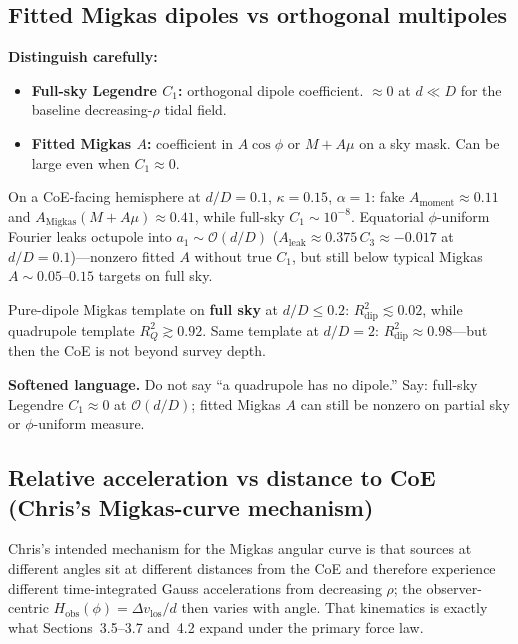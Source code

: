 \documentclass[11pt,a4paper]{article}
\begin{document}
\subsection{Fitted Migkas dipoles vs orthogonal multipoles}

\textbf{Distinguish carefully:}
\begin{itemize}
\item \textbf{Full-sky Legendre \(C_1\):} orthogonal dipole coefficient. \(\approx 0\) at \(d\ll D\) for the baseline decreasing-\(\rho\) tidal field.
\item \textbf{Fitted Migkas \(A\):} coefficient in \(A\cos\phi\) or \(M+A\mu\) on a sky mask. Can be large even when \(C_1\approx 0\).
\end{itemize}

On a CoE-facing hemisphere at \(d/D=0.1\), \(\kappa=0.15\), \(\alpha=1\): fake \(A_{\mathrm{moment}}\approx 0.11\) and \(A_{\mathrm{Migkas}}(M+A\mu)\approx 0.41\), while full-sky \(C_1\sim 10^{-8}\). Equatorial \(\phi\)-uniform Fourier leaks octupole into \(a_1\sim\mathcal{O}(d/D)\) (\(A_{\mathrm{leak}}\approx 0.375\,C_3\approx -0.017\) at \(d/D=0.1\))---nonzero fitted \(A\) without true \(C_1\), but still below typical Migkas \(A\sim 0.05\)--\(0.15\) targets on full sky.

Pure-dipole Migkas template on \textbf{full sky} at \(d/D\le 0.2\): \(R^2_{\mathrm{dip}}\lesssim 0.02\), while quadrupole template \(R^2_Q\gtrsim 0.92\). Same template at \(d/D=2\): \(R^2_{\mathrm{dip}}\approx 0.98\)---but then the CoE is not beyond survey depth.

\textbf{Softened language.} Do not say ``a quadrupole has no dipole.'' Say: full-sky Legendre \(C_1\approx 0\) at \(\mathcal{O}(d/D)\); fitted Migkas \(A\) can still be nonzero on partial sky or \(\phi\)-uniform measure.

\subsection{Relative acceleration vs distance to CoE (Chris's Migkas-curve mechanism)}

Chris's intended mechanism for the Migkas angular curve is that sources at different angles sit at different distances from the CoE and therefore experience different time-integrated Gauss accelerations from decreasing \(\rho\); the observer-centric \(H_{\mathrm{obs}}(\phi)=\Delta v_{\mathrm{los}}/d\) then varies with angle. That kinematics is exactly what Sections~3.5--3.7 and~4.2 expand under the primary force law.
\end{document}
